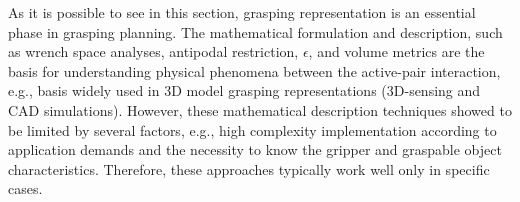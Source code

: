 







As it is possible to see in this section, grasping representation is an essential phase in grasping planning. The mathematical formulation and description, such as wrench space analyses, antipodal restriction, $\epsilon$, and volume metrics are the basis for understanding physical phenomena between the active-pair interaction, e.g., basis widely used in 3D model grasping representations (3D-sensing and CAD simulations). However, these mathematical description techniques showed to be limited by several factors, e.g., high complexity implementation according to application demands and the necessity to know the gripper and graspable object characteristics. Therefore, these approaches typically work well only in specific cases.  

